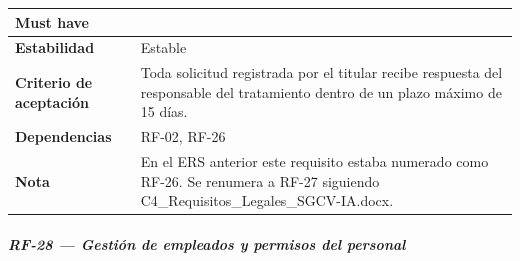 \documentclass[
]{article}
\begin{document}
{\begin{longtable}[]{|
  >{\raggedright\arraybackslash}p{}|
  >{\raggedright\arraybackslash}p{}|}
\begin{minipage}[t]{\linewidth}
Must have
\end{minipage} \\
\hline
\textbf{Estabilidad} & \begin{minipage}[t]{\linewidth}\raggedright
Estable
\end{minipage} \\
\hline
\textbf{Criterio de aceptación} &
\begin{minipage}[t]{\linewidth}\raggedright
Toda solicitud registrada por el titular recibe respuesta del responsable del tratamiento dentro de un plazo máximo de 15 días.
\end{minipage} \\
\hline
\textbf{Dependencias} & \begin{minipage}[t]{\linewidth}\raggedright
RF-02, RF-26
\end{minipage} \\
\hline
\textbf{Nota} & \begin{minipage}[t]{\linewidth}\raggedright
En el ERS anterior este requisito estaba numerado como RF-26. Se renumera a RF-27 siguiendo C4\_Requisitos\_Legales\_SGCV-IA.docx.
\end{minipage} \\
\hline
\end{longtable}
}

\subparagraph{RF-28 --- Gestión de empleados y permisos del personal}\label{rf-28-gestion-de-empleados-y-permisos-del-personal}
\end{document}
